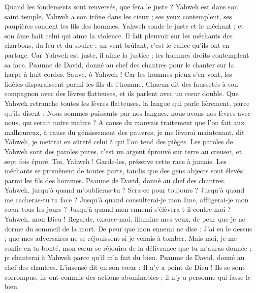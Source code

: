 \begin{multicols}{2}
Quand les fondements sont renversés, que fera le juste ?
Yahweh est dans son saint temple, Yahweh a son trône dans les cieux ; ses yeux contemplent, ses paupières sondent les fils des hommes.
Yahweh sonde le juste et le méchant ; et son âme hait celui qui aime la violence.
Il fait pleuvoir sur les méchants des charbons, du feu et du soufre ; un vent brûlant, c’est le calice qu’ils ont en partage.
Car Yahweh est juste, il aime la justice ; les hommes droits contemplent sa face.
\VerseOne{}Psaume de David, donné au chef des chantres pour le chanter sur la harpe à huit cordes.
Sauve, ô Yahweh ! Car les hommes pieux s’en vont, les fidèles disparaissent parmi les fils de l’homme.
Chacun dit des faussetés à son compagnon avec des lèvres flatteuses, et ils parlent avec un cœur double.
Que Yahweh retranche toutes les lèvres flatteuses, la langue qui parle fièrement,
parce qu'ils disent : Nous sommes puissants par nos langues, nous avons nos lèvres avec nous, qui serait notre maître ?
A cause du mauvais traitement que l'on fait aux malheureux, à cause du gémissement des pauvres, je me lèverai maintenant, dit Yahweh, je mettrai en sûreté celui à qui l'on tend des pièges.
Les paroles de Yahweh sont des paroles pures, c'est un argent éprouvé sur terre au creuset, et sept fois épuré.
Toi, Yahweh ! Garde-les, préserve cette race à jamais.
Les méchants se promènent de toutes parts, tandis que des gens abjects sont élevés parmi les fils des hommes.
\VerseOne{}Psaume de David, donné au chef des chantres.
Yahweh, jusqu’à quand m'oublieras-tu ? Sera-ce pour toujours ? Jusqu’à quand me cacheras-tu ta face ?
Jusqu’à quand consulterai-je mon âme, affligerai-je mon cœur tous les jours ? Jusqu’à quand mon ennemi s'élèvera-t-il contre moi ?
Yahweh, mon Dieu ! Regarde, exauce-moi, illumine mes yeux, de peur que je ne dorme du sommeil de la mort.
De peur que mon ennemi ne dise : J'ai eu le dessus ; que mes adversaires ne se réjouissent si je venais à tomber.
Mais moi, je me confie en ta bonté, mon cœur se réjouira de la délivrance que tu m'auras donnée ; je chanterai à Yahweh parce qu’il m’a fait du bien.
\VerseOne{}Psaume de David, donné au chef des chantres. L'insensé dit en son cœur : Il n'y a point de Dieu ! Ils se sont corrompus, ils ont commis des actions abominables ; il n'y a personne qui fasse le bien.

\end{multicols}
